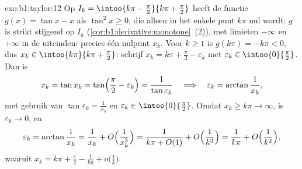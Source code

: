 \begin{solution}{exo:b1:taylor:12}
Op $I_k = \intoo{k\pi - \frac\pi2}{k\pi + \frac\pi2}$ heeft de
functie $g(x) = \tan x - x$ als  $\tan^2 x \geq 0$, die
alleen in het enkele punt $k\pi$ nul wordt: $g$ is strikt stijgend
op $I_k$ (\cref{cor:b1:derivative:monotone}~(2)), met limieten
$-\infty$ en $+\infty$ in de uiteinden: precies één nulpunt $x_k$.
Voor $k \geq 1$ is $g(k\pi) = -k\pi < 0$, dus $x_k \in
\intoo{k\pi}{k\pi + \frac\pi2}$: schrijf $x_k = k\pi + \frac\pi2 -
\varepsilon_k$ met $\varepsilon_k \in \intoo{0}{\frac\pi2}$. Dan
is
\[
x_k = \tan x_k = \tan\Bigl(\frac\pi2 - \varepsilon_k\Bigr)
= \frac{1}{\tan\varepsilon_k}
\quad\Longrightarrow\quad
\varepsilon_k = \arctan\frac{1}{x_k} ,
\]
met gebruik van $\tan\varepsilon_k = \frac{1}{x_k}$ en
$\varepsilon_k \in \intoo{0}{\frac\pi2}$. Omdat $x_k \geq k\pi \to
\infty$, is $\varepsilon_k \to 0$, en
\[
\varepsilon_k = \arctan\frac{1}{x_k} = \frac{1}{x_k} +
O\Bigl(\frac{1}{x_k^3}\Bigr)
= \frac{1}{k\pi + O(1)} + O\Bigl(\frac{1}{k^3}\Bigr)
= \frac{1}{k\pi} + O\Bigl(\frac{1}{k^2}\Bigr) ,
\]
waaruit $x_k = k\pi + \frac\pi2 - \frac{1}{k\pi} +
o\bigl(\frac1k\bigr)$.
\end{solution}

